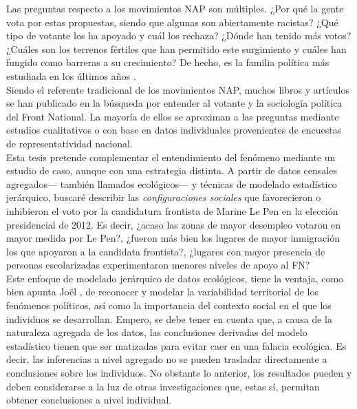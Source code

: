 Las preguntas respecto a los movimientos NAP son múltiples. ¿Por qué la gente vota por estas propuestas, siendo que algunas son abiertamente racistas? ¿Qué tipo de votante los ha apoyado y cuál los rechaza? ¿Dónde han tenido más votos? ¿Cuáles son los terrenos fértiles que han permitido este surgimiento y cuáles han fungido como barreras a su crecimiento? De hecho, es la familia política más estudiada en los últimos años \parencite{Mudde16}.\\ 

Siendo el referente tradicional de los movimientos NAP, muchos libros y artículos se han publicado en la búsqueda por entender al votante y la sociología política del Front National. La mayoría de ellos se aproximan a las preguntas mediante estudios cualitativos o con base en datos individuales provenientes de encuestas de representatividad nacional.\\ 

Esta tesis pretende complementar el entendimiento del fenómeno mediante un estudio de caso, aunque con una estrategia distinta. A partir de datos censales agregados--- también llamados ecológicos--- y técnicas de modelado estadístico jerárquico, buscaré describir las \textit{configuraciones sociales} que favorecieron o inhibieron el voto por la candidatura frontista de Marine Le Pen en la elección presidencial de 2012. Es decir, ¿acaso las zonas de mayor desempleo votaron en mayor medida por Le Pen?, ¿fueron más bien los lugares de mayor inmigración los que apoyaron a la candidata frontista?, ¿lugares con mayor presencia de personas escolarizadas experimentaron menores niveles de apoyo al FN?\\

Este enfoque de modelado jerárquico de datos ecológicos, tiene la ventaja, como bien apunta Joël \textcite{Gombin05}, de reconocer y modelar la variabilidad territorial de los fenómenos políticos, así como la importancia del contexto social en el que los individuos se desarrollan. Empero, se debe tener en cuenta que, a causa de la naturaleza agregada de los datos, las conclusiones derivadas del modelo estadístico tienen que ser matizadas para evitar caer en una falacia ecológica. Es decir, las inferencias a nivel agregado no se pueden trasladar directamente a conclusiones sobre los individuos. No obstante lo anterior, los resultados pueden y deben considerarse a la luz de otras investigaciones que, estas sí, permitan obtener conclusiones a nivel individual.\\ 

